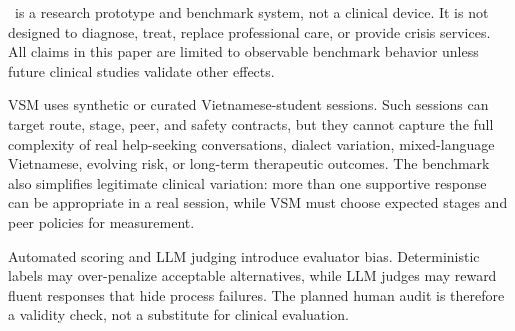 \trace\ is a research prototype and benchmark system, not a clinical device. It is not designed to diagnose, treat, replace professional care, or provide crisis services. All claims in this paper are limited to observable benchmark behavior unless future clinical studies validate other effects.

VSM uses synthetic or curated Vietnamese-student sessions. Such sessions can target route, stage, peer, and safety contracts, but they cannot capture the full complexity of real help-seeking conversations, dialect variation, mixed-language Vietnamese, evolving risk, or long-term therapeutic outcomes. The benchmark also simplifies legitimate clinical variation: more than one supportive response can be appropriate in a real session, while VSM must choose expected stages and peer policies for measurement.

Automated scoring and LLM judging introduce evaluator bias. Deterministic labels may over-penalize acceptable alternatives, while LLM judges may reward fluent responses that hide process failures. The planned human audit is therefore a validity check, not a substitute for clinical evaluation.

